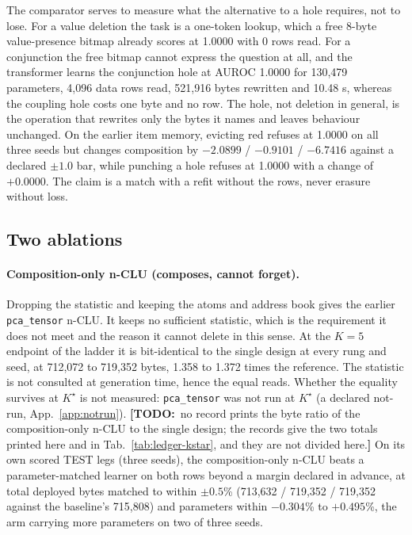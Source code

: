 \documentclass{article} %
\newcommand{\TODO}[1]{{\color{orange}\textbf{[TODO:}~#1\textbf{]}}}
\newcommand{\Kstar}{\ensuremath{K^{\star}}}
\begin{document}
\noindent The comparator serves to measure what the alternative to a hole requires, not to lose. For a value
deletion the task is a one-token lookup, which a free 8-byte value-presence bitmap already scores
at 1.0000 with 0 rows read. For a conjunction the free bitmap cannot express the question at
all, and the transformer learns the conjunction hole at AUROC 1.0000 for 130,479 parameters,
4,096 data rows read, 521,916 bytes rewritten and 10.48 s, whereas the coupling hole costs one
byte and no row. %
\noindent The hole, not deletion in general, is the operation that rewrites only the bytes it names and
leaves behaviour unchanged. On the earlier item memory, evicting red refuses at 1.0000 on all three
seeds but changes composition by $-2.0899$ / $-0.9101$ / $-6.7416$ against a declared $\pm1.0$ bar,
while punching a hole refuses at 1.0000 with a change of $+0.0000$. %
The claim is a match with a refit without the rows, never erasure without loss.

\subsection{Two ablations}
\label{sec:ablations}

\paragraph{Composition-only n-CLU (composes, cannot forget).} Dropping the statistic and keeping the atoms and address book gives the earlier \texttt{pca\_tensor} n-CLU. It keeps no
sufficient statistic, which is the requirement it does not meet and the reason it cannot delete in this sense. At the $K=5$ endpoint of the ladder it is bit-identical to the single design at every rung and seed, at 712,072 to 719,352 bytes, 1.358 to 1.372 times the reference.
The statistic is not consulted at generation time, hence the equal reads. Whether the
equality survives at $\Kstar$ is not measured: \texttt{pca\_tensor} was not run at
$\Kstar$ (a declared not-run, App.~\ref{app:notrun}). \TODO{no record prints the byte ratio of the composition-only n-CLU to the single design;
the records give the two totals printed here and in Tab.~\ref{tab:ledger-kstar}, and they are
not divided here.}
On its own scored TEST legs (three seeds), the composition-only n-CLU beats a parameter-matched
learner on both rows beyond a margin declared in advance, at total deployed bytes matched to within $\pm0.5$\% (713,632 / 719,352 / 719,352 against the baseline's 715,808) and parameters within $-0.304$\% to $+0.495$\%, the arm carrying more parameters on two of three seeds.
\end{document}
